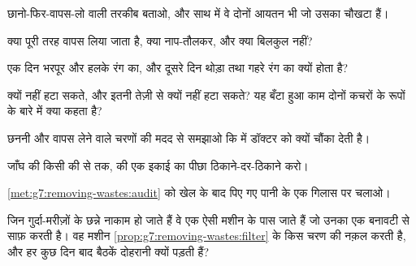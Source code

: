 \begin{exercise}[$\star$]\label{exo:g7:removing-wastes:4}
छानो-फिर-वापस-लो वाली तरकीब बताओ, और साथ में वे दोनों आयतन भी जो उसका
चौखटा हैं।
\end{exercise}

\begin{exercise}[$\star$]\label{exo:g7:removing-wastes:5}
क्या पूरी तरह वापस लिया जाता है, क्या नाप-तौलकर, और क्या बिलकुल नहीं?
\end{exercise}

\begin{exercise}[$\star$]\label{exo:g7:removing-wastes:6}
 एक दिन भरपूर और हलके रंग का, और दूसरे दिन थोड़ा तथा गहरे रंग का
क्यों होता है?
\end{exercise}

\begin{exercise}[$\star\star$]\label{exo:g7:removing-wastes:7}
  क्यों नहीं हटा सकते, और   इतनी
तेज़ी से क्यों नहीं हटा सकते? यह बँटा हुआ काम दोनों कचरों के रूपों के
बारे में क्या कहता है?
\end{exercise}

\begin{exercise}[$\star\star$]\label{exo:g7:removing-wastes:8}
छननी और वापस लेने वाले चरणों की मदद से समझाओ कि  में 
डॉक्टर को क्यों चौंका देती है।
\end{exercise}

\begin{exercise}[$\star\star$]\label{exo:g7:removing-wastes:9}
जाँघ की किसी  की  से  तक,  की एक इकाई का पीछा
ठिकाने-दर-ठिकाने करो।
\end{exercise}

\begin{exercise}[$\star\star$]\label{exo:g7:removing-wastes:10}
\cref{met:g7:removing-wastes:audit} को खेल के बाद पिए गए पानी के एक
गिलास पर चलाओ।
\end{exercise}

\begin{exercise}[$\star\star$]\label{exo:g7:removing-wastes:11}
जिन गुर्दा-मरीज़ों के छन्ने नाकाम हो जाते हैं वे एक ऐसी मशीन के पास
जाते हैं जो उनका  एक बनावटी  से साफ़ करती है। वह मशीन
\cref{prop:g7:removing-wastes:filter} के किस चरण की नक़ल करती है, और
हर कुछ दिन बाद बैठकें दोहरानी क्यों पड़ती हैं?
\end{exercise}

